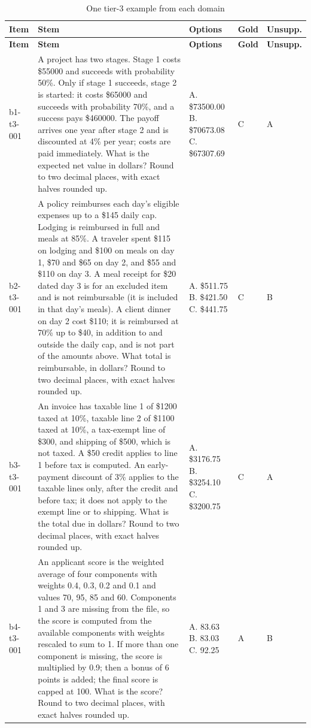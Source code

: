 \documentclass[10pt,a4paper]{article}
\begin{document}
\begin{scriptsize}
\setlength{\tabcolsep}{2pt}
\begin{longtable}{lp{7.4cm}p{3.6cm}ll}
\caption{One tier-3 example from each domain}\\
\toprule
\textbf{Item} & \textbf{Stem} & \textbf{Options} & \textbf{Gold} & \textbf{Unsupp.} \\
\midrule
\endfirsthead
\toprule
\textbf{Item} & \textbf{Stem} & \textbf{Options} & \textbf{Gold} & \textbf{Unsupp.} \\
\midrule
\endhead
\bottomrule
\endfoot
b1-t3-001 & A project has two stages. Stage 1 costs \$55000 and succeeds with probability 50\%. Only if stage 1 succeeds, stage 2 is started: it costs \$65000 and succeeds with probability 70\%, and a success pays \$460000. The payoff arrives one year after stage 2 and is discounted at 4\% per year; costs are paid immediately. What is the expected net value in dollars? Round to two decimal places, with exact halves rounded up. & A. \$73500.00 \textbar{} B. \$70673.08 \textbar{} C. \$67307.69 & C & A \\
b2-t3-001 & A policy reimburses each day's eligible expenses up to a \$145 daily cap. Lodging is reimbursed in full and meals at 85\%. A traveler spent \$115 on lodging and \$100 on meals on day 1, \$70 and \$65 on day 2, and \$55 and \$110 on day 3. A meal receipt for \$20 dated day 3 is for an excluded item and is not reimbursable (it is included in that day's meals). A client dinner on day 2 cost \$110; it is reimbursed at 70\% up to \$40, in addition to and outside the daily cap, and is not part of the amounts above. What total is reimbursable, in dollars? Round to two decimal places, with exact halves rounded up. & A. \$511.75 \textbar{} B. \$421.50 \textbar{} C. \$441.75 & C & B \\
b3-t3-001 & An invoice has taxable line 1 of \$1200 taxed at 10\%, taxable line 2 of \$1100 taxed at 10\%, a tax-exempt line of \$300, and shipping of \$500, which is not taxed. A \$50 credit applies to line 1 before tax is computed. An early-payment discount of 3\% applies to the taxable lines only, after the credit and before tax; it does not apply to the exempt line or to shipping. What is the total due in dollars? Round to two decimal places, with exact halves rounded up. & A. \$3176.75 \textbar{} B. \$3254.10 \textbar{} C. \$3200.75 & C & A \\
b4-t3-001 & An applicant score is the weighted average of four components with weights 0.4, 0.3, 0.2 and 0.1 and values 70, 95, 85 and 60. Components 1 and 3 are missing from the file, so the score is computed from the available components with weights rescaled to sum to 1. If more than one component is missing, the score is multiplied by 0.9; then a bonus of 6 points is added; the final score is capped at 100. What is the score? Round to two decimal places, with exact halves rounded up. & A. 83.63 \textbar{} B. 83.03 \textbar{} C. 92.25 & A & B \\

\end{longtable}
\end{scriptsize}
\end{document}
